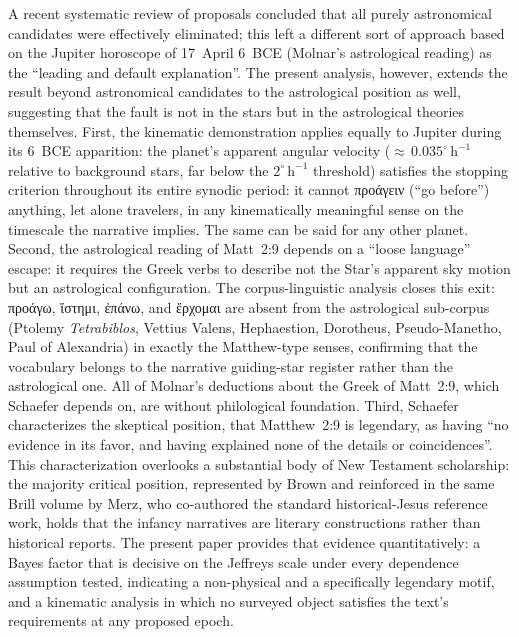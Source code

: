 \documentclass[sn-nature]{sn-jnl}
\newcommand{\grk}[1]{{\fontencoding{LGR}\selectfont #1}}
\newcommand{\grk}[1]{{\greekfont #1}}
\begin{document}
A recent systematic review of proposals concluded that all purely
astronomical candidates were effectively eliminated; this left a different sort of approach based
on the Jupiter horoscope of 17~April 6~BCE (Molnar's astrological reading) as the ``leading and default
explanation''\cite{schaefer2015,schaefer2015molnar}. The present analysis, however,
extends the result beyond astronomical candidates to the astrological position
as well, suggesting that the fault is not in the stars but in the astrological
theories themselves.
First, the kinematic demonstration applies equally to Jupiter during its
6~BCE apparition: the planet's apparent angular velocity (${\approx}\,0.035^\circ\,\mathrm{h}^{-1}$
relative to background stars, far below the $2^\circ\,\mathrm{h}^{-1}$ threshold)
satisfies the stopping criterion throughout its entire synodic period: it
cannot \grk{προάγειν} (``go before'') anything, let alone travelers, in any kinematically
meaningful sense on the timescale the narrative implies. The same can be said for any other planet. 
Second, the astrological reading of Matt~2:9 depends on a ``loose language''
escape: it requires the Greek verbs to describe not the Star's apparent sky
motion but an astrological configuration.
The corpus-linguistic analysis closes this exit: \grk{προάγω}, \grk{ἵστημι},
\grk{ἐπάνω}, and \grk{ἔρχομαι} are absent from the astrological sub-corpus
(Ptolemy \textit{Tetrabiblos}, Vettius Valens, Hephaestion, Dorotheus,
Pseudo-Manetho, Paul of Alexandria) in exactly the Matthew-type senses,
confirming that the vocabulary belongs to the narrative guiding-star register
rather than the astrological one. All of Molnar's deductions about the Greek of Matt~2:9, 
which Schaefer depends on, are without philological foundation\cite{birdsall2002,heilen2015,adair2013star}. 
Third, Schaefer characterizes the skeptical position, that Matthew~2:9 is legendary, as
having ``no evidence in its favor, and having explained none of the details or
coincidences''\cite{schaefer2015molnar}.
This characterization overlooks a substantial body of New Testament scholarship: the majority critical position, 
represented by Brown\cite{brown1993} and reinforced in the same Brill volume by Merz, who co-authored the standard 
historical-Jesus reference work\cite{merz2015}, holds that the infancy narratives are literary constructions rather than historical reports.
The present paper provides that evidence quantitatively: a Bayes factor that is
decisive on the Jeffreys scale under every dependence assumption tested,
indicating a non-physical and a specifically legendary motif,
and a kinematic analysis in which no surveyed object satisfies the text's requirements at any proposed epoch.
\end{document}
